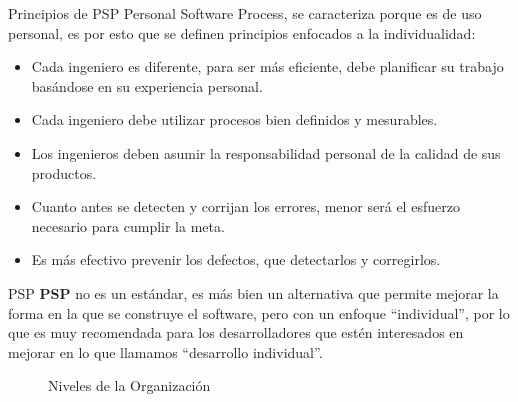 \documentclass{beamer}
\begin{document}
			\begin{frame}{Principios de PSP}
				Personal Software Process, se caracteriza porque es de uso personal, es por esto que se definen principios enfocados a la individualidad:				
				\begin{itemize}
					\smallskip
					\item Cada ingeniero es diferente, para ser más eficiente, debe planificar su trabajo basándose en su experiencia personal.\\ \pause
					\item Cada ingeniero debe utilizar procesos bien definidos y mesurables.\\ \pause
					\item Los ingenieros deben asumir la responsabilidad personal de la calidad de sus productos.\\ \pause
					\item Cuanto antes se detecten y corrijan los errores, menor será el esfuerzo necesario para cumplir la meta.\\ \pause
					\item Es más efectivo prevenir los defectos, que detectarlos y corregirlos.\\
				\end{itemize}
			\end{frame}						
			
			\begin{frame}{PSP}
				\textbf{PSP} no es un est\'andar, es m\'as bien un alternativa que permite mejorar la forma en la que se construye el software, pero con un enfoque ``individual'', por lo que es muy recomendada para los desarrolladores que estén interesados en mejorar en lo que llamamos ``desarrollo individual''.
				\begin{figure}
    				 \caption{Niveles de la Organización}
				\end{figure}
			\end{frame}
				
\end{document}
